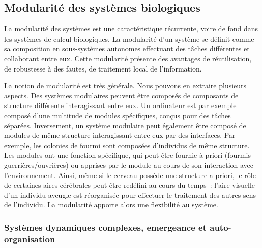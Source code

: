 
\subsection*{Modularité des systèmes biologiques}

La modularité des systèmes est une caractéristique récurrente, voire de fond dans les systèmes de calcul biologiques.
La modularité d'un système se définit comme sa composition en sous-systèmes autonomes effectuant des tâches différentes et collaborant entre eux. 
Cette modularité présente des avantages de réutilisation, de robustesse à des fautes, de traitement local de l'information. 

\cite{clune_evolutionary_2013}


La notion de modularité est très générale. Nous pouvons en extraire plusieurs aspects. Des systèmes modulaires peuvent être composés de composants de structure différente interagissant entre eux. Un ordinateur est par exemple composé d'une multitude de modules spécifiques, conçus pour des tâches séparées.
Inversement, un système modulaire peut également être composé de modules de même structure interagissant entre eux par des interfaces. Par exemple, les colonies de fourmi sont composées d'individus de même structure.
Les modules ont une fonction spécifique, qui peut être fournie à priori (fourmis guerrières/ouvrières) ou apprises par le module au cours de son interaction avec l'environnement.
Ainsi, même si le cerveau possède une structure a priori, le rôle de certaines aires cérébrales peut être redéfini au cours du temps~: l'aire visuelle d'un individu aveugle est réorganisée pour effectuer le traitement des autres sens de l'individu. La modularité apporte alors une flexibilité au système.

\subsubsection*{Systèmes dynamiques complexes, emergeance et auto-organisation}

